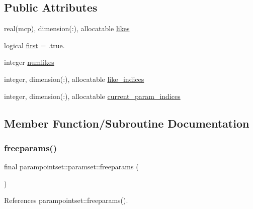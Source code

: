 \subsection*{Public Attributes}
\begin{DoxyCompactItemize}
\item 
real(mcp), dimension(\+:), allocatable \mbox{\hyperlink{structparampointset_1_1paramset_ae827e622601df6d1ec30509674fa6fed}{likes}}
\item 
logical \mbox{\hyperlink{structparampointset_1_1paramset_aee77e1670ad4c0bb93a22c94f0de4a0a}{first}} = .true.
\item 
integer \mbox{\hyperlink{structparampointset_1_1paramset_a601f68d2b8cd9203d7684b9f2685eb12}{numlikes}}
\item 
integer, dimension(\+:), allocatable \mbox{\hyperlink{structparampointset_1_1paramset_aba13bcd32de352394c363179c2d8a412}{like\+\_\+indices}}
\item 
integer, dimension(\+:), allocatable \mbox{\hyperlink{structparampointset_1_1paramset_a1f33b0afc215df4aeb9cee80095d76c9}{current\+\_\+param\+\_\+indices}}
\end{DoxyCompactItemize}


\subsection{Member Function/\+Subroutine Documentation}
\mbox{\label{structparampointset_1_1paramset_a867d45dc423d0d6a2ca03b75bd64d83a}} 
\subsubsection{\texorpdfstring{freeparams()}{freeparams()}}
{\footnotesize\ttfamily final parampointset\+::paramset\+::freeparams (\begin{DoxyParamCaption}{ }\end{DoxyParamCaption})\hspace{0.3cm}{\ttfamily [final]}}



References parampointset\+::freeparams().

